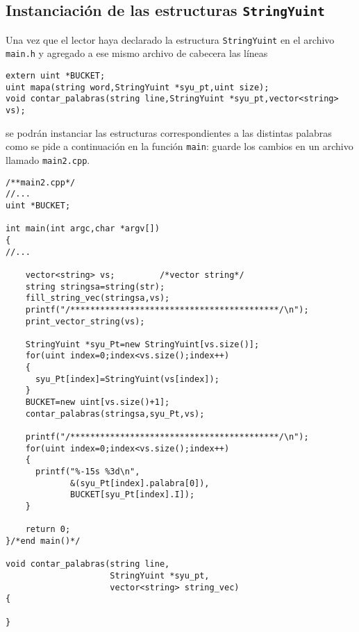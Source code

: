 \documentclass[12pt]{article}
\begin{document}
\subsection*{Instanciaci\'{o}n de las estructuras {\tt StringYuint}}
Una vez que el lector haya declarado la estructura {\tt StringYuint} en el archivo {\tt main.h} 
y agregado a ese mismo archivo de cabecera las l\'{i}neas
\begin{verbatim}
extern uint *BUCKET;
uint mapa(string word,StringYuint *syu_pt,uint size);
void contar_palabras(string line,StringYuint *syu_pt,vector<string> vs);
\end{verbatim}
se podr\'{a}n instanciar las estructuras correspondientes a las distintas palabras como se pide 
a continuaci\'{o}n en la funci\'{o}n {\tt main}: guarde los cambios en un archivo llamado 
{\tt main2.cpp}.
\begin{verbatim}
/**main2.cpp*/
//...
uint *BUCKET;

int main(int argc,char *argv[])
{
//...
    
    vector<string> vs;         /*vector string*/
    string stringsa=string(str);
    fill_string_vec(stringsa,vs);
    printf("/******************************************/\n");
    print_vector_string(vs);
    
    StringYuint *syu_Pt=new StringYuint[vs.size()];
    for(uint index=0;index<vs.size();index++)
    {
      syu_Pt[index]=StringYuint(vs[index]);
    }
    BUCKET=new uint[vs.size()+1];
    contar_palabras(stringsa,syu_Pt,vs);

    printf("/******************************************/\n");
    for(uint index=0;index<vs.size();index++)
    {
      printf("%-15s %3d\n",
             &(syu_Pt[index].palabra[0]),
             BUCKET[syu_Pt[index].I]);
    }    
    
    return 0;
}/*end main()*/

void contar_palabras(string line,
                     StringYuint *syu_pt,
                     vector<string> string_vec)
{

}
\end{verbatim} 
\end{document}
